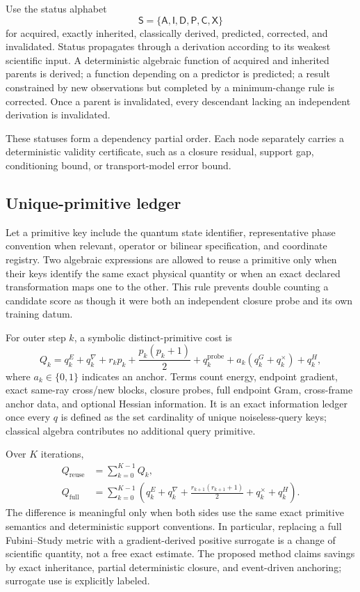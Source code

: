 \documentclass[10pt,twocolumn]{article}
\theoremstyle{definition}
\theoremstyle{remark}
\newcommand{\A}{\mathsf A}
\newcommand{\I}{\mathsf I}
\newcommand{\D}{\mathsf D}
\newcommand{\Prd}{\mathsf P}
\newcommand{\Cor}{\mathsf C}
\newcommand{\Inv}{\mathsf X}
\begin{document}
Use the status alphabet
\begin{equation}
 \mathsf S=\{\A,\I,\D,\Prd,\Cor,\Inv\}
 \label{eq:appstatus}
\end{equation}
for acquired, exactly inherited, classically derived, predicted, corrected,
and invalidated.  Status propagates through a derivation according to its
weakest scientific input.  A deterministic algebraic function of acquired
and inherited parents is derived; a function depending on a predictor is
predicted; a result constrained by new observations but completed by a
minimum-change rule is corrected.  Once a parent is invalidated, every
descendant lacking an independent derivation is invalidated.

These statuses form a dependency partial order.  Each node separately carries
a deterministic validity certificate, such as a closure residual, support
gap, conditioning bound, or transport-model error bound.

\subsection{Unique-primitive ledger}

Let a primitive key include the quantum state identifier, representative
phase convention when relevant, operator or bilinear specification, and
coordinate registry.  Two algebraic expressions are allowed to reuse a
primitive only when their keys identify the same exact physical quantity or
when an exact declared transformation maps one to the other.  This rule
prevents double counting a candidate score as though it were both an
independent closure probe and its own training datum.

For outer step $k$, a symbolic distinct-primitive cost is
\begin{equation}
 Q_k=
 q_k^E+q_k^\nabla+
 r_kp_k+\frac{p_k(p_k+1)}2+
 q_k^{\mathrm{probe}}+
 a_k(q_k^{G}+q_k^{\times})+
 q_k^{H},
 \label{eq:appcost}
\end{equation}
where $a_k\in\{0,1\}$ indicates an anchor.  Terms count energy, endpoint
gradient, exact same-ray cross/new blocks, closure probes, full endpoint Gram,
cross-frame anchor data, and optional Hessian information.  It is an exact
information ledger once every $q$ is defined as the set cardinality of unique
noiseless-query keys; classical algebra contributes no additional query primitive.

Over $K$ iterations,
\begin{align}
 Q_{\mathrm{reuse}}
 &=\sum_{k=0}^{K-1}Q_k,\nonumber\\
 Q_{\mathrm{full}}
 &=\sum_{k=0}^{K-1}
 \left(q_k^E+q_k^\nabla+\frac{r_{k+1}(r_{k+1}+1)}2
 +q_k^\times+q_k^H\right).
 \label{eq:apptotalcost}
\end{align}
The difference is meaningful only when both sides use the same exact primitive
semantics and deterministic support conventions.  In particular, replacing a full
Fubini--Study metric with a gradient-derived positive surrogate is a change
of scientific quantity, not a free exact estimate.  The proposed method
claims savings by exact inheritance, partial deterministic closure, and
event-driven anchoring; surrogate use is explicitly labeled.
\end{document}
